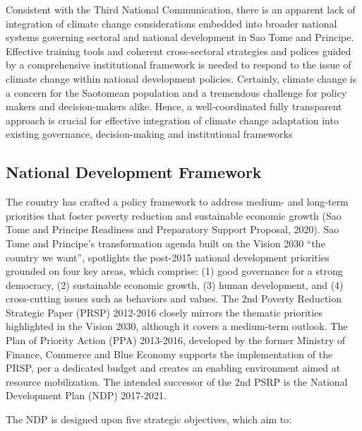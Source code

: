 \documentclass[
]{book}
\begin{document}
Consistent with the Third National Communication, there is an apparent lack of integration of climate change considerations embedded into broader national systems governing sectoral and national development in Sao Tome and Principe. Effective training tools and coherent cross-sectoral strategies and polices guided by a comprehensive institutional framework is needed to respond to the issue of climate change within national development policies. Certainly, climate change is a concern for the Saotomean population and a tremendous challenge for policy makers and decision-makers alike. Hence, a well-coordinated fully transparent approach is crucial for effective integration of climate change adaptation into existing governance, decision-making and institutional frameworks

\hypertarget{national-development-framework}{%
\subsection{National Development Framework}\label{national-development-framework}}

The country has crafted a policy framework to address medium- and long-term priorities that foster poverty reduction and sustainable economic growth (Sao Tome and Principe Readiness and Preparatory Support Proposal, 2020). Sao Tome and Principe's transformation agenda built on the Vision 2030 ``the country we want'', spotlights the post-2015 national development priorities grounded on four key areas, which comprise: (1) good governance for a strong democracy, (2) sustainable economic growth, (3) human development, and (4) cross-cutting issues such as behaviors and values. The 2nd Poverty Reduction Strategic Paper (PRSP) 2012-2016 closely mirrors the thematic priorities highlighted in the Vision 2030, although it covers a medium-term outlook. The Plan of Priority Action (PPA) 2013-2016, developed by the former Ministry of Finance, Commerce and Blue Economy supports the implementation of the PRSP, per a dedicated budget and creates an enabling environment aimed at resource mobilization. The intended successor of the 2nd PSRP is the National Development Plan (NDP) 2017-2021.

The NDP is designed upon five strategic objectives, which aim to:
\end{document}
